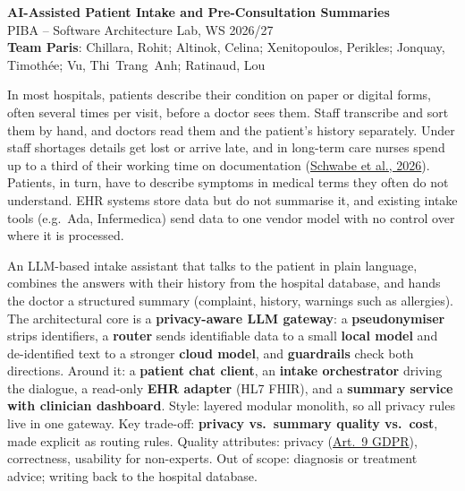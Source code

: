 \documentclass[11pt,a4paper]{article}
\newcommand{\pibapart}[1]{\vspace{0.4em}{\large\textbf{#1}}\par}
\newcommand{\projecttitle}{AI-Assisted Patient Intake and Pre-Consultation Summaries}
\newcommand{\teamname}{Team Paris}
\newcommand{\teammembers}{Chillara, Rohit; Altinok, Celina; Xenitopoulos, Perikles; Jonquay, Timoth\'ee; Vu, Thi~Trang~Anh; Ratinaud, Lou}
\begin{document}
\begin{center}
  {\LARGE\textbf{\projecttitle}}\\[0.4em]
  {\large PIBA -- Software Architecture Lab, WS 2026/27}\\[0.3em]
  \textbf{\teamname}: \teammembers
\end{center}

\pibapart{Problem}
In most hospitals, patients describe their condition on paper or digital forms,
often several times per visit, before a doctor sees them. Staff transcribe and sort them by hand, and doctors read them and the
patient's history separately. Under staff shortages details get lost or arrive
late, and in long-term care nurses spend up to a third of their working time on
documentation (\href{https://doi.org/10.2196/86078}{Schwabe et al., 2026}). Patients, in turn, have to describe
symptoms in medical terms they often do not understand. EHR systems store data but do not summarise it, and existing intake tools (e.g.\ Ada, Infermedica) send data to one vendor model with no control over where it is processed.

\pibapart{Idea}
An LLM-based intake assistant that talks to the patient in plain language,
combines the answers with their history from the hospital database, and hands
the doctor a structured summary (complaint, history, warnings such as
allergies). The architectural core is a \textbf{privacy-aware LLM gateway}:
a \textbf{pseudonymiser} strips identifiers, a \textbf{router} sends
identifiable data to a small \textbf{local model} and de-identified text to a
stronger \textbf{cloud model}, and \textbf{guardrails} check both directions.
Around it: a \textbf{patient chat client}, an \textbf{intake orchestrator}
driving the dialogue, a read-only \textbf{EHR adapter} (HL7 FHIR), and a
\textbf{summary service with clinician dashboard}. Style: layered modular
monolith, so all privacy rules live in one gateway. Key trade-off:
\textbf{privacy vs.\ summary quality vs.\ cost}, made explicit as routing
rules. Quality attributes: privacy (\href{https://eur-lex.europa.eu/eli/reg/2016/679/oj}{Art.~9 GDPR}),
correctness, usability for non-experts. Out of scope: diagnosis or treatment
advice; writing back to the hospital database.
\end{document}
